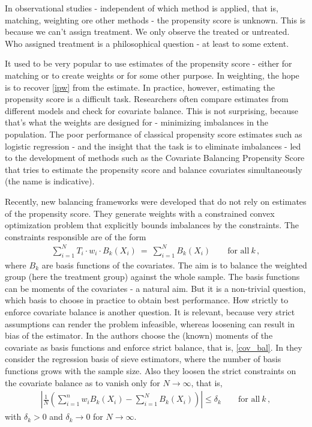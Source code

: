 In observational studies - independent of which method is applied, that is, matching, weighting ore other methods -
the propensity score is unknown.
This is because we can't assign treatment. We only observe the treated or untreated. Who assigned treatment is a philosophical question - at least to some extent.

It used to be very popular to use estimates of the propensity score - either for matching or to create weights or for some other purpose.
In weighting, the hope is to recover \eqref{ipw} from the estimate.
In practice, however, estimating the propensity score is a difficult task.
Researchers often compare estimates from different models and check for covariate balance. 
This is not surprising, because that's what the weights are designed for - minimizing imbalances in the population.
The poor performance of classical propensity score estimates such as logistic regression - and the insight that the task is to eliminate imbalances -
led to the development of methods such as the Covariate Balancing Propensity Score \cite{Imai2014a} that tries to 
estimate the propensity score and balance covariates simultaneously (the name is indicative).

Recently, new balancing frameworks were developed that do not rely on estimates of the propensity score\cite{Hainmueller2012,Zubizarreta2015}.
They generate weights with a constrained convex optimization problem that explicitly bounds imbalances by the constraints. 
The constraints responsible are of the form
\begin{gather}
  \label{cov_bal}
    \sum_{i=1}^{N}
    T_i
    \cdot
    w_i
    \cdot
    B_k(X_i)
    \ 
  =
    \ 
    \sum_{i=1}^{N} 
    B_k(X_i)
  \qquad
  \text{for all}\ 
  k\,,
\end{gather}
where $B_k$ are basis functions of the covariates.
The aim is to balance the weighted group (here the treatment group) against the whole sample.
The basis functions can be moments of the covariates - a natural aim. 
But it is a non-trivial question, which basis to choose in practice to obtain best performance.
How strictly to enforce covariate balance is another question.
It is relevant, because very strict assumptions can render the problem infeasible, whereas loosening can result in bias of the estimator.
In \cite{Hainmueller2012} the authors choose the (known) moments of the covariate as basis functions and enforce strict balance, that is, \eqref{cov_bal}.
In \cite{Wang2019} they consider the regression basis of sieve estimators\cite{Newey1997a}, where the number of basis functions grows with the sample size.
Also they loosen the strict constraints on the covariate balance as to vanish only for $N\to\infty$, that is,
\begin{gather*}
  \left| 
  \frac{1}{N}
  \left( 
    \sum_{i=1}^{n}
    w_i
    B_k(X_i)
    -
    \sum_{i=1}^{N} 
    B_k(X_i)
  \right)
  \right|
  \le
  \delta_k
  \qquad
  \text{for all}\ 
  k\,,
\end{gather*}
with $\delta_k > 0 $ and $\delta_k\to 0$ for $N\to\infty$.

